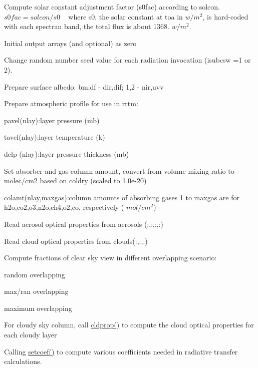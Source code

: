 \begin{DoxyEnumerate}
\item Compute solar constant adjustment factor (s0fac) according to solcon. ~\newline
 $ s0fac = solcon/s0 $ ~\newline
 where s0, the solar constant at toa in $ w/m^2 $, is hard-\/coded with each spectran band, the total flux is about 1368. $ w/m^2 $.
\item Initial output arrays (and optional) as zero
\item Change random number seed value for each radiation invocation (isubcsw =1 or 2).
\item Prepare surface albedo\+: bm,df -\/ dir,dif; 1,2 -\/ nir,uvv
\item Prepare atmospheric profile for use in rrtm\+:
\begin{DoxyItemize}
\item pavel(nlay)\+:layer pressure (mb)
\item tavel(nlay)\+:layer temperature (k)
\item delp (nlay)\+:layer pressure thickness (mb)
\end{DoxyItemize}
\item Set absorber and gas column amount, convert from volume mixing ratio to molec/cm2 based on coldry (scaled to 1.\+0e-\/20)
\begin{DoxyItemize}
\item colamt(nlay,maxgas)\+:column amounts of absorbing gases 1 to maxgas are for h2o,co2,o3,n2o,ch4,o2,co, respectively ( $ mol/cm^2 $)
\end{DoxyItemize}
\item Read aerosol optical properties from aerosols (\+:,\+:,\+:,\+:)
\item Read cloud optical properties from clouds(\+:,\+:,\+:)
\item Compute fractions of clear sky view in different overlapping scenario\+:
\begin{DoxyItemize}
\item random overlapping
\item max/ran overlapping
\item maximum overlapping
\end{DoxyItemize}
\item For cloudy sky column, call \hyperlink{group__module__radsw__main_ga1a3bb4385e7a610aa7eec9759383ffe9}{cldprop()} to compute the cloud optical properties for each cloudy layer
\item Calling \hyperlink{group__module__radsw__main_gaaa580fe228ccc04abd54368c8df0f312}{setcoef()} to compute various coefficients needed in radiative transfer calculations.

\end{DoxyEnumerate}
